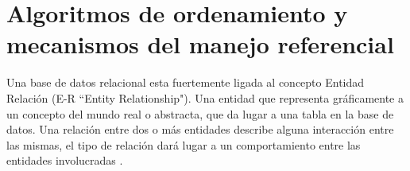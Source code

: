 
\chapter{Algoritmos de ordenamiento y mecanismos del manejo referencial}
\label{Algoritmos de ordenamiento y mecanismos del manejo referencial}
Una base de datos relacional esta fuertemente ligada al concepto Entidad Relaci\'on \cite{FBD}(E-R ``Entity Relationship"). Una entidad que representa gr\'aficamente a un concepto del mundo real o abstracta, que da lugar a una tabla en la base de datos. Una relaci\'on entre dos o m\'as entidades describe alguna interacci\'on entre las mismas, el tipo de relaci\'on  dar\'a lugar a un comportamiento entre las entidades involucradas \cite{introbasedatos}.


